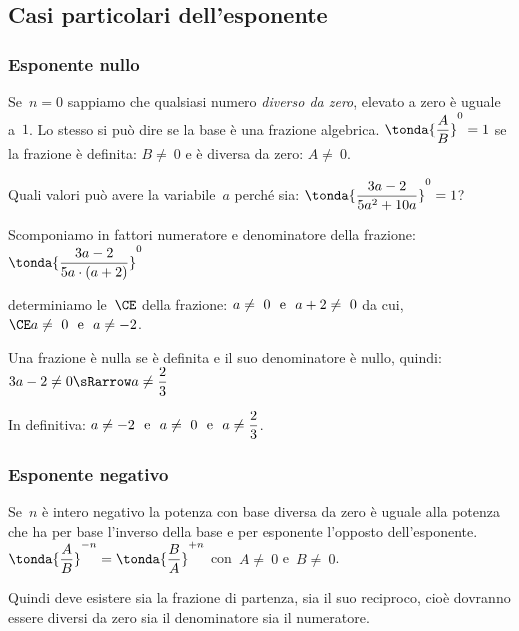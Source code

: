 \subsection{Casi particolari dell'esponente}

\subsubsection{Esponente nullo}
Se~\(n = 0\) sappiamo che qualsiasi numero \emph{diverso da zero}, elevato a 
zero è uguale a~\(1\). 
Lo stesso si può dire se la base è una frazione algebrica.
\(\tonda{\dfrac{A}{B}}^0=1\) se la frazione è definita: 
\(B\neq~0\) e è diversa da zero: \(A\neq~0\).
 \begin{esempio}
Quali valori può avere la variabile~\(a\) perché sia: 
\( \tonda{\dfrac{3a-2}{5a^{2}+10a}} ^{0}=1\)?
\begin{itemize*}
 \item Scomponiamo in fattori numeratore e denominatore della 
  frazione:~\( \tonda{\dfrac{3a-2}{5a\cdot (a+2)}} ^{0}\)
 \item determiniamo le~\(\CE\) della frazione:
 \(a\neq~0 \text{~~e~~} a+2\neq~0\) 
  da cui, \(\CE a\neq~0 \stext{e} a\neq -2\).
\item Una frazione è nulla se è definita e il suo denominatore è nullo, 
quindi:
\(3a-2 \neq 0 \sRarrow a\neq \dfrac{2}{3}\)
\end{itemize*}
In definitiva: \(a\neq -2 \text{~~e~~} a\neq~0 \text{~~e~~} a\neq \dfrac{2}{3}\).
 \end{esempio}

\subsubsection{Esponente negativo}
Se~\(n\) è intero negativo la potenza con base diversa da zero è uguale alla 
potenza che ha per base l'inverso della base e per esponente l'opposto
dell'esponente. 
\( \tonda{\dfrac{A}{B}} ^{-n}=
  \tonda{\dfrac{B}{A}} ^{+n}\) con~\(A\neq~0\) e~\(B\neq~0\).

Quindi deve esistere sia la frazione di partenza, sia il suo reciproco, cioè 
dovranno essere diversi da zero sia il denominatore sia il numeratore.

